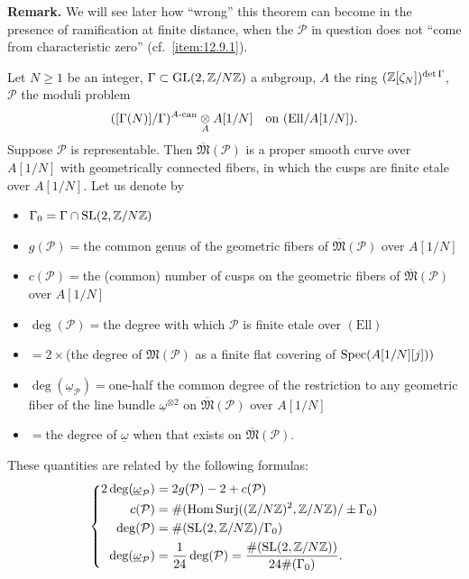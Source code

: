 \noindent\textbf{Remark.}
We will see later how ``wrong'' this theorem can become in the presence of ramification at finite distance, when the $\mathcal{P}$ in question does not ``come from characteristic zero'' (cf.~\ref{item:12.9.1}).

\begin{kcor}\label{cor:10.13.12}
Let $N \ge 1$ be an integer, $\Gamma \subset \operatorname{GL}(2, \allowbreak\mathbb{Z}/N\mathbb{Z})$ a subgroup, $A$ the ring $(\mathbb{Z}[\zeta_N])^{\det\Gamma}$, $\mathcal{P}$ the moduli problem
\[
([\Gamma(N)]/\Gamma)^{A\text{\rm-can}} \underset{A}{\otimes} A[1/N] \quad\text{on } (\mathrm{Ell}/A[1/N]) .
\]
Suppose $\mathcal{P}$ is representable. Then $\overline{\mathfrak{M}}(\mathcal{P})$ is a proper smooth curve over $A[1/N]$ with geometrically connected fibers, in which the cusps are finite etale over $A[1/N]$. Let us denote by
\begin{itemize}[leftmargin=2.5em, itemsep=2pt, topsep=3pt]
\item[] $\Gamma_0 = \Gamma \cap \operatorname{SL}(2, \mathbb{Z}/N\mathbb{Z})$
\item[] $g(\mathcal{P}) = {}$the common genus of the geometric fibers of $\overline{\mathfrak{M}}(\mathcal{P})$ over $A[1/N]$
\item[] $c(\mathcal{P}) = {}$the (common) number of cusps on the geometric fibers of $\overline{\mathfrak{M}}(\mathcal{P})$ over $A[1/N]$
\item[] $\deg(\mathcal{P}) = {}$the degree with which $\mathcal{P}$ is finite etale over $(\mathrm{Ell})$
\item[]  ${}= 2 \times {}$(the degree of $\mathfrak{M}(\mathcal{P})$ as a finite flat covering of $\operatorname{Spec}(A[1/N][j]))$
\item[] $\deg(\underline{\omega}_{\mathcal{P}}) = {}$one-half the common degree of the restriction to any geometric fiber of the line bundle $\underline{\omega}^{\otimes 2}$ on $\overline{\mathfrak{M}}(\mathcal{P})$ over $A[1/N]$
\item[]  ${}= {}$the degree of $\underline{\omega}$ when that exists on $\overline{\mathfrak{M}}(\mathcal{P})$.
\end{itemize}
These quantities are related by the following formulas:
\[
\left\{
\begin{aligned}
2\deg(\underline{\omega}_{\mathcal{P}}) &= 2g(\mathcal{P}) - 2 + c(\mathcal{P}) \\
c(\mathcal{P}) &= \#(\mathrm{Hom\,Surj}((\mathbb{Z}/N\mathbb{Z})^2, \mathbb{Z}/N\mathbb{Z})/\pm \Gamma_0) \\
\deg(\mathcal{P}) &= \#(\operatorname{SL}(2, \mathbb{Z}/N\mathbb{Z})/\Gamma_0) \\
\deg(\underline{\omega}_{\mathcal{P}}) &= \frac{1}{24}\deg(\mathcal{P}) = \frac{\#(\operatorname{SL}(2, \mathbb{Z}/N\mathbb{Z}))}{24\#(\Gamma_0)} .
\end{aligned}
\right.
\]
\end{kcor}

